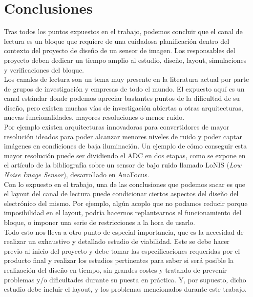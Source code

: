 \chapter{Conclusiones}

Tras todos los puntos expuestos en el trabajo, podemos concluir que el canal de
lectura es un bloque que requiere de una cuidadosa planificación dentro del
contexto del proyecto de diseño de un sensor de imagen. Los responsables del
proyecto deben dedicar un tiempo amplio al estudio, diseño, layout, simulaciones
y verificaciones del bloque.\\

Los canales de lectura son un tema muy presente en la literatura actual por parte
de grupos de investigación y empresas de todo el mundo. El expuesto aquí es un
canal estándar donde podemos apreciar bastantes puntos de la dificultad de su
diseño, pero existen muchas vías de investigación abiertas a otras arquitecturas,
nuevas funcionalidades, mayores resoluciones o menor ruido.\\

Por ejemplo existen arquitecturas innovadoras para convertidores de mayor resolución
ideados para poder alcanzar menores niveles de ruido y poder captar imágenes en
condiciones de baja iluminación. Un ejemplo de cómo conseguir esta mayor resolución
puede ser dividiendo el ADC en dos etapas, como se expone en el artículo de la
bibliografía\cite{Gonzalez-Charlet2015:Low_noise} sobre un sensor de bajo ruido
llamado LoNIS (\textit{Low Noise Image Sensor}), desarrollado en AnaFocus\cite{anafocus}.\\

Con lo expuesto en el trabajo, una de las conclusiones que podemos sacar es que
el layout del canal de lectura puede condicionar ciertos aspectos del diseño del
electrónico del mismo. Por ejemplo, algún acoplo que no podamos reducir porque
imposibilidad en el layout, podría hacernos replantearnos el funcionamiento
del bloque, o imponer una serie de restricciones a la hora de usarlo.\\

Todo esto nos lleva a otro punto de especial importancia, que es la necesidad de
realizar un exhaustivo y detallado estudio de viabilidad. Este se debe hacer
previo al inicio del proyecto y debe tomar las especificaciones requeridas por el
producto final y realizar los estudios pertinentes para saber si será posible la
realización del diseño en tiempo, sin grandes costes y tratando de prevenir problemas
y/o dificultades durante su puesta en práctica. Y, por supuesto, dicho estudio debe
incluir el layout, y los problemas mencionados durante este trabajo.\\

